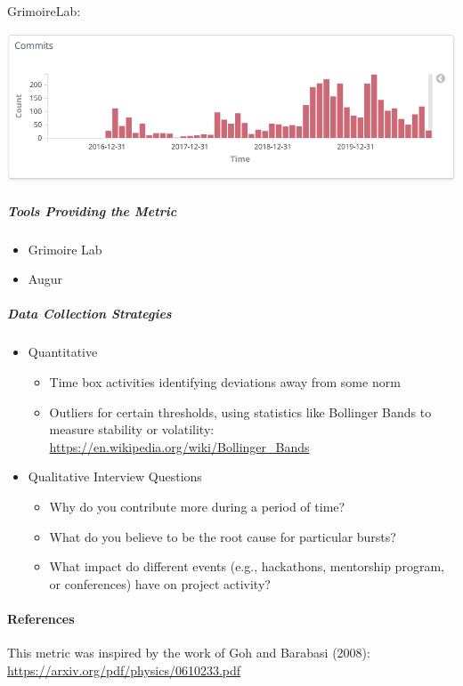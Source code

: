 GrimoireLab:

\includegraphics{images/burstiness_gl.png}

\hypertarget{tools-providing-the-metric}{%
\subparagraph{Tools Providing the
Metric}\label{tools-providing-the-metric}}

\begin{itemize}
\tightlist
\item
  Grimoire Lab
\item
  Augur
\end{itemize}

\hypertarget{data-collection-strategies}{%
\subparagraph{Data Collection
Strategies}\label{data-collection-strategies}}

\begin{itemize}
\item
  Quantitative

  \begin{itemize}
  \tightlist
  \item
    Time box activities identifying deviations away from some norm
  \item
    Outliers for certain thresholds, using statistics like Bollinger
    Bands to measure stability or volatility:
    \url{https://en.wikipedia.org/wiki/Bollinger_Bands}
  \end{itemize}
\item
  Qualitative Interview Questions

  \begin{itemize}
  \tightlist
  \item
    Why do you contribute more during a period of time?
  \item
    What do you believe to be the root cause for particular bursts?
  \item
    What impact do different events (e.g., hackathons, mentorship
    program, or conferences) have on project activity?
  \end{itemize}
\end{itemize}

\hypertarget{references}{%
\paragraph{References}\label{references}}

This metric was inspired by the work of Goh and Barabasi (2008):
\url{https://arxiv.org/pdf/physics/0610233.pdf}
